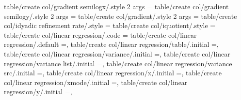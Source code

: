 {{{{{{{{{{{{{table/create col/gradient semilogx/.style 2 args                   ={                                                                                                                                 
table/create col/gradient semilogy/.style 2 args                   ={                                                                                                                                 
table/create col/gradient/.style 2 args                            ={                                                                                                                                 
table/create col/idyadic refinement rate/.style                    ={                                                                                                                                 
table/create col/iquotient/.style                                  ={                                                                                                                                 
table/create col/linear regression/.code                           ={                                                                                                                                 
table/create col/linear regression/.default                        =,                                                                                                                                 
table/create col/linear regression/table/.initial                  =,                                                                                                                                 
table/create col/linear regression/variance/.initial               =,                                                                                                                                 
table/create col/linear regression/variance list/.initial          =,                                                                                                                                 
table/create col/linear regression/variance src/.initial           =,                                                                                                                                 
table/create col/linear regression/x/.initial                      =,                                                                                                                                 
table/create col/linear regression/xmode/.initial                  =,%
table/create col/linear regression/y/.initial                      =,                                                                                                                                 
}}}}}}}}}}}}}}}}}}}
